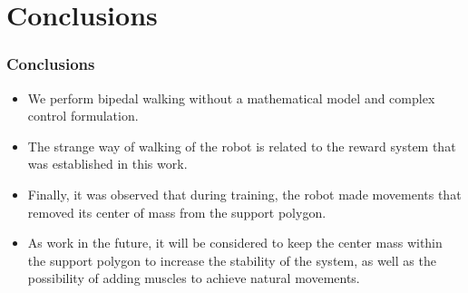 \section{Conclusions}
\begin{frame}
	\frametitle{Conclusions}
	\begin{itemize}
		\item We perform  bipedal walking without a mathematical model and complex control formulation.
		\item The strange way of walking of the robot is related to the reward system that was established in this work.
		\item  Finally, it was observed that during training, the robot made movements that removed its center of mass from the support polygon.
		\item As work in the future, it will be considered to keep the center mass within the support polygon to increase the stability of the system, as well as the possibility of adding muscles to achieve natural movements.
	\end{itemize}
	
\end{frame}